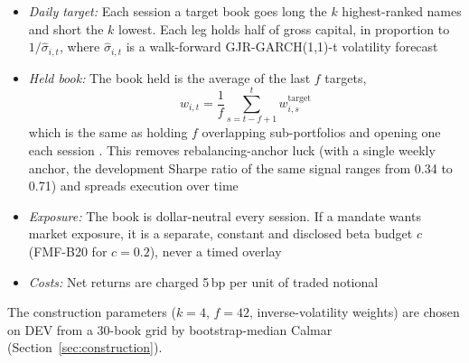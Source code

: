 \begin{itemize}
  \item \emph{Daily target:} Each session a target book goes long the $k$ highest-ranked names and short the $k$ lowest. Each leg holds half of gross capital, in proportion to $1/\hat\sigma_{i,t}$, where $\hat\sigma_{i,t}$ is a walk-forward GJR-GARCH(1,1)-t volatility forecast \citep{glosten1993}
  \item \emph{Held book:} The book held is the average of the last $f$ targets,
  \begin{equation}
  w_{i,t}=\frac1f\sum_{s=t-f+1}^{t} w^{\text{target}}_{i,s}\label{eq:tranche}
  \end{equation}
  which is the same as holding $f$ overlapping sub-portfolios and opening one each session \citep{jegadeesh1993}. This removes rebalancing-anchor luck (with a single weekly anchor, the development Sharpe ratio of the same signal ranges from 0.34 to 0.71) and spreads execution over time
  \item \emph{Exposure:} The book is dollar-neutral every session. If a mandate wants market exposure, it is a separate, constant and disclosed beta budget $c$ (FMF-B20 for $c=0.2$), never a timed overlay
  \item \emph{Costs:} Net returns are charged 5\,bp per unit of traded notional
\end{itemize}
The construction parameters ($k=4$, $f=42$, inverse-volatility weights) are chosen on DEV from a 30-book grid by bootstrap-median Calmar (Section~\ref{sec:construction}).
